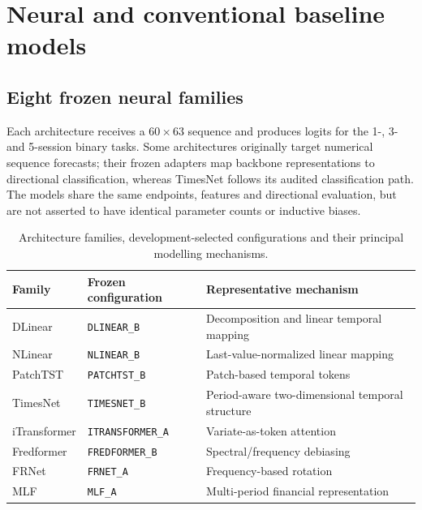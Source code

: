 \documentclass[fleqn,10pt]{wlscirep}
\begin{document}
\section{Neural and conventional baseline models}\label{sec:models}
\subsection{Eight frozen neural families}
Each architecture receives a $60\times63$ sequence and produces logits for the 1-, 3- and 5-session binary tasks. Some architectures originally target numerical sequence forecasts; their frozen adapters map backbone representations to directional classification, whereas TimesNet follows its audited classification path. The models share the same endpoints, features and directional evaluation, but are not asserted to have identical parameter counts or inductive biases.

\begin{table}[htbp]\centering\small
\caption{Architecture families, development-selected configurations and their principal modelling mechanisms.}\label{tab:architectures}
\begin{tabular}{@{}lll@{}}\toprule
Family & Frozen configuration & Representative mechanism \\ \midrule
DLinear & \texttt{DLINEAR\_B} & Decomposition and linear temporal mapping \\
NLinear & \texttt{NLINEAR\_B} & Last-value-normalized linear mapping \\
PatchTST & \texttt{PATCHTST\_B} & Patch-based temporal tokens \\
TimesNet & \texttt{TIMESNET\_B} & Period-aware two-dimensional temporal structure \\
iTransformer & \texttt{ITRANSFORMER\_A} & Variate-as-token attention \\
Fredformer & \texttt{FREDFORMER\_B} & Spectral/frequency debiasing \\
FRNet & \texttt{FRNET\_A} & Frequency-based rotation \\
MLF & \texttt{MLF\_A} & Multi-period financial representation \\
\bottomrule\end{tabular}
\end{table}
\end{document}

